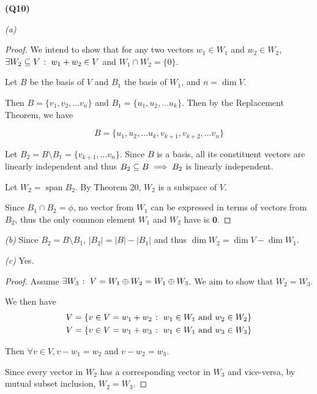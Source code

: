 \documentclass[12pt, a4paper]{article}
\begin{document}
\textbf{(Q10)}

\textit{(a)}

\begin{proof}
    We intend to show that for any two vectors $w_1 \in W_1$ and
    $w_2 \in W_2$,
    $\exists W_2 \subseteq V \; \colon \; w_1 + w_2 \in V$ and
    $W_1 \cap W_2 = \{0\}$.

    Let $B$ be the basis of $V$ and $B_1$ the basis of $W_1$,
    and $n = \dim V$.

    Then $B = \{v_1, v_2, \ldots v_n\}$
    and $B_1 = \{u_1, u_2, \ldots u_k\}$. Then by the Replacement Theorem,
    we have

    \[
        B = \{u_1, u_2, \ldots u_k, v_{k + 1}, v_{k + 2}, \ldots v_n\}
    \]

    Let $B_2 = B \setminus B_1 = \{v_{k + 1}, \ldots v_n\}$.
    Since $B$ is a basis, all its constituent vectors are linearly independent
    and thus $B_2 \subseteq B \implies B_2$ is linearly independent.

    Let $W_2 = \operatorname{span} B_2$. By Theorem 20, $W_2$ is a subspace of $V$.

    Since $B_1 \cap B_2 = \phi$, no vector from $W_1$ can be expressed in
    terms of vectors from $B_2$, thus the only common element $W_1$ and $W_2$
    have is $\mathbf{0}$.
\end{proof}

\textit{(b)}
Since $B_2 = B \setminus B_1$, $|B_2| = |B| - |B_1|$ and thus
$\dim W_2 = \dim V - \dim W_1$.

\textit{(c)} Yes.

\begin{proof}
    Assume $\exists W_3 \; \colon \; V = W_1 \oplus W_2 = W_1 \oplus W_3$.
    We aim to show that $W_2 = W_3$.

    We then have
    \begin{gather*}
        V = \{v \in V = w_1 + w_2 \; \colon \; w_1 \in W_1 \text{ and } w_2 \in W_2\}\\
        V = \{v \in V = w_1 + w_3 \; \colon \; w_1 \in W_1 \text{ and } w_3 \in W_3\}
    \end{gather*}

    Then $\forall v \in V, v - w_1 = w_2$ and $v - w_2 = w_3$.

    Since every vector in $W_2$ has a corresponding vector in $W_3$
    and vice-versa, by mutual subset inclusion, $W_2 = W_3$.
\end{proof}
\end{document}
